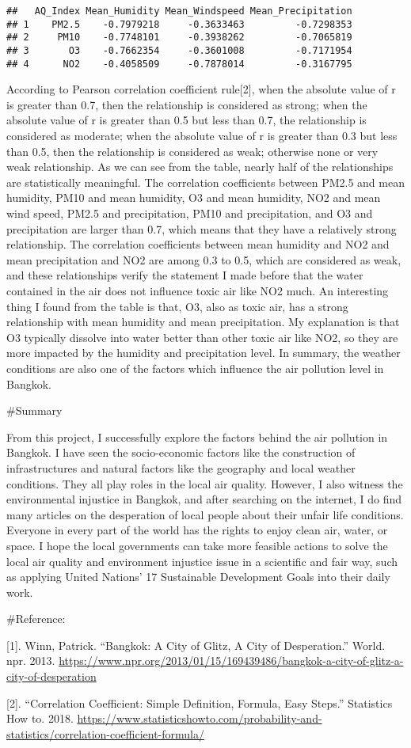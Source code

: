 \documentclass[
]{article}
\begin{document}
\begin{verbatim}
##   AQ_Index Mean_Humidity Mean_Windspeed Mean_Precipitation
## 1    PM2.5    -0.7979218     -0.3633463         -0.7298353
## 2     PM10    -0.7748101     -0.3938262         -0.7065819
## 3       O3    -0.7662354     -0.3601008         -0.7171954
## 4      NO2    -0.4058509     -0.7878014         -0.3167795
\end{verbatim}

According to Pearson correlation coefficient rule{[}2{]}, when the
absolute value of r is greater than 0.7, then the relationship is
considered as strong; when the absolute value of r is greater than 0.5
but less than 0.7, the relationship is considered as moderate; when the
absolute value of r is greater than 0.3 but less than 0.5, then the
relationship is considered as weak; otherwise none or very weak
relationship. As we can see from the table, nearly half of the
relationships are statistically meaningful. The correlation coefficients
between PM2.5 and mean humidity, PM10 and mean humidity, O3 and mean
humidity, NO2 and mean wind speed, PM2.5 and precipitation, PM10 and
precipitation, and O3 and precipitation are larger than 0.7, which means
that they have a relatively strong relationship. The correlation
coefficients between mean humidity and NO2 and mean precipitation and
NO2 are among 0.3 to 0.5, which are considered as weak, and these
relationships verify the statement I made before that the water
contained in the air does not influence toxic air like NO2 much. An
interesting thing I found from the table is that, O3, also as toxic air,
has a strong relationship with mean humidity and mean precipitation. My
explanation is that O3 typically dissolve into water better than other
toxic air like NO2, so they are more impacted by the humidity and
precipitation level. In summary, the weather conditions are also one of
the factors which influence the air pollution level in Bangkok.

\#Summary

From this project, I successfully explore the factors behind the air
pollution in Bangkok. I have seen the socio-economic factors like the
construction of infrastructures and natural factors like the geography
and local weather conditions. They all play roles in the local air
quality. However, I also witness the environmental injustice in Bangkok,
and after searching on the internet, I do find many articles on the
desperation of local people about their unfair life conditions. Everyone
in every part of the world has the rights to enjoy clean air, water, or
space. I hope the local governments can take more feasible actions to
solve the local air quality and environment injustice issue in a
scientific and fair way, such as applying United Nations' 17 Sustainable
Development Goals into their daily work.

\#Reference:

{[}1{]}. Winn, Patrick. ``Bangkok: A City of Glitz, A City of
Desperation.'' World. npr. 2013.
\url{https://www.npr.org/2013/01/15/169439486/bangkok-a-city-of-glitz-a-city-of-desperation}

{[}2{]}. ``Correlation Coefficient: Simple Definition, Formula, Easy
Steps.'' Statistics How to. 2018.
\url{https://www.statisticshowto.com/probability-and-statistics/correlation-coefficient-formula/}
\end{document}
